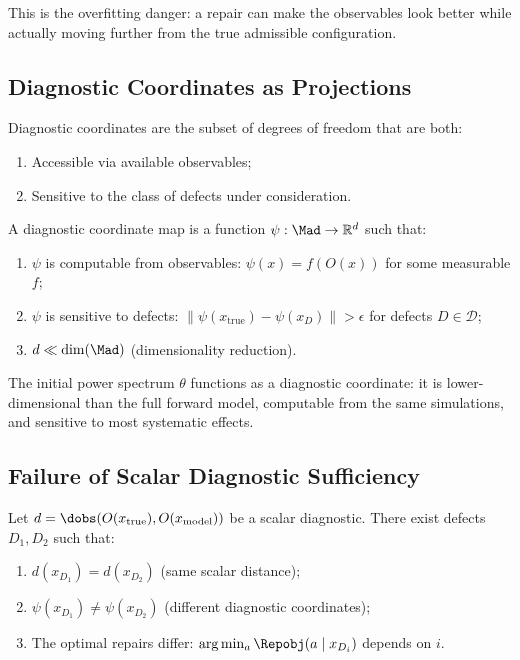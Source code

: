 This is the overfitting danger: a repair can make the observables look better while actually moving further from the true admissible configuration.


\subsection{Diagnostic Coordinates as Projections}

Diagnostic coordinates are the subset of degrees of freedom that are both:
\begin{enumerate}
\item Accessible via available observables;
\item Sensitive to the class of defects under consideration.
\end{enumerate}

\begin{definition}
A diagnostic coordinate map is a function $\psi: \Mad \to \mathbb{R}^d$ such that:
\begin{enumerate}
\item $\psi$ is computable from observables: $\psi(x) = f(O(x))$ for some measurable $f$;
\item $\psi$ is sensitive to defects: $\|\psi(x_{\mathrm{true}}) - \psi(x_D)\| > \epsilon$ for defects $D \in \mathcal{D}$;
\item $d \ll \dim(\Mad)$ (dimensionality reduction).
\end{enumerate}
\end{definition}

The initial power spectrum $\theta$ functions as a diagnostic coordinate: it is lower-dimensional than the full forward model, computable from the same simulations, and sensitive to most systematic effects.


\subsection{Failure of Scalar Diagnostic Sufficiency}

\begin{proposition}
Let $d = \dobs(O(x_{\mathrm{true}}), O(x_{\mathrm{model}}))$ be a scalar diagnostic. There exist defects $D_1, D_2$ such that:
\begin{enumerate}
\item $d(x_{D_1}) = d(x_{D_2})$ (same scalar distance);
\item $\psi(x_{D_1}) \neq \psi(x_{D_2})$ (different diagnostic coordinates);
\item The optimal repairs differ: $\arg\min_{a} \Repobj(a \mid x_{D_i})$ depends on $i$.
\end{enumerate}
\end{proposition}

